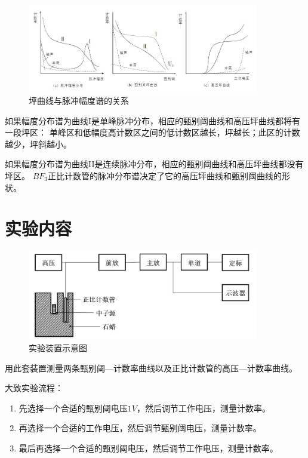 \documentclass[a4paper,UTF8]{ctexart}
\begin{document}
\begin{figure}[H]
    \centering
    \begin{minipage}[b]{1\textwidth}
        \centering
        \includegraphics[width=0.9\textwidth]{./fig2.jpg}
        \caption{坪曲线与脉冲幅度谱的关系}
    \end{minipage}
\end{figure}

如果幅度分布谱为曲线I是单峰脉冲分布，相应的甄别阈曲线和高压坪曲线都将有一段坪区：
单峰区和低幅度高计数区之间的低计数区越长，坪越长；此区的计数越少，坪斜越小。

如果幅度分布谱为曲线II是连续脉冲分布，相应的甄别阈曲线和高压坪曲线都没有坪区。
$BF_3$正比计数管的脉冲分布谱决定了它的高压坪曲线和甄别阈曲线的形状。

\section{实验内容}

\begin{figure}[H]
    \centering
    \begin{minipage}[b]{0.9\textwidth}
        \centering
        \includegraphics[width=0.9\textwidth]{./fig3.jpg}
        \caption{实验装置示意图}
    \end{minipage}
\end{figure}

用此套装置测量两条甄别阈—计数率曲线以及正比计数管的高压—计数率曲线。

大致实验流程：

\begin{enumerate}
    \item 先选择一个合适的甄别阈电压$1V$，然后调节工作电压，测量计数率。
    \item 再选择一个合适的工作电压，然后调节甄别阈电压，测量计数率。
    \item 最后再选择一个合适的甄别阈电压，然后调节工作电压，测量计数率。
\end{enumerate}
\end{document}
